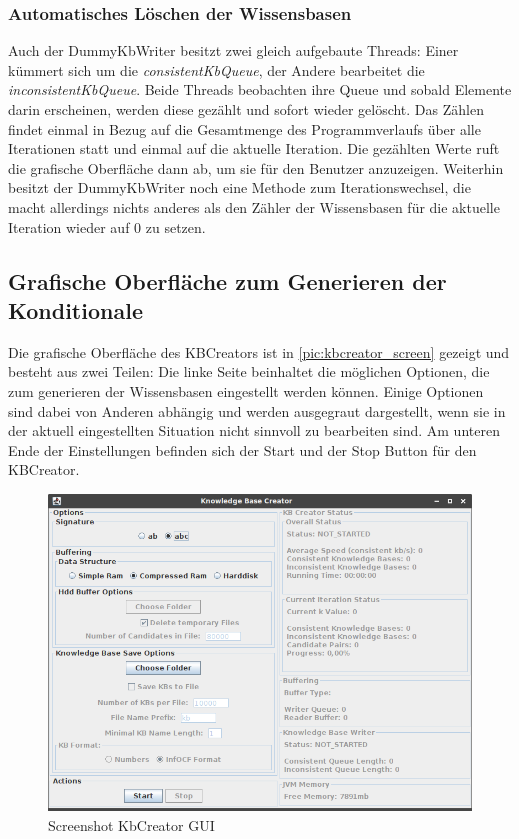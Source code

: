 \documentclass[12pt,a4paper]{article}
\begin{document}
\subsubsection{Automatisches Löschen der Wissensbasen}
\label{sec:dummywriter}

Auch der DummyKbWriter besitzt zwei gleich aufgebaute Threads: Einer kümmert sich um die \textit{consistentKbQueue}, der Andere bearbeitet die \textit{inconsistentKbQueue}. Beide Threads beobachten ihre Queue und sobald Elemente darin erscheinen, werden diese gezählt und sofort wieder gelöscht. Das Zählen findet einmal  in Bezug auf die Gesamtmenge des Programmverlaufs über alle Iterationen statt und einmal auf die aktuelle Iteration. Die gezählten Werte ruft die grafische Oberfläche dann ab, um sie für den Benutzer anzuzeigen. Weiterhin besitzt der DummyKbWriter noch eine Methode zum Iterationswechsel, die macht allerdings nichts anderes als den Zähler der Wissensbasen für die aktuelle Iteration wieder auf 0 zu setzen.

\subsection{Grafische Oberfläche zum Generieren der Konditionale}





Die grafische Oberfläche des KBCreators ist in \autoref{pic:kbcreator_screen} gezeigt und besteht aus zwei Teilen: Die linke Seite beinhaltet die möglichen Optionen, die zum generieren der Wissensbasen eingestellt werden können. Einige Optionen sind dabei von Anderen abhängig und werden ausgegraut dargestellt, wenn sie in der aktuell eingestellten Situation nicht sinnvoll zu bearbeiten sind. Am unteren Ende der Einstellungen befinden sich der Start und der Stop Button für den KBCreator.

\begin{figure}
\includegraphics[width=0.97\linewidth]{bilder/KbCreator_screen.png}
\caption{Screenshot KbCreator GUI}
\label{pic:kbcreator_screen}
\end{figure}
\end{document}
